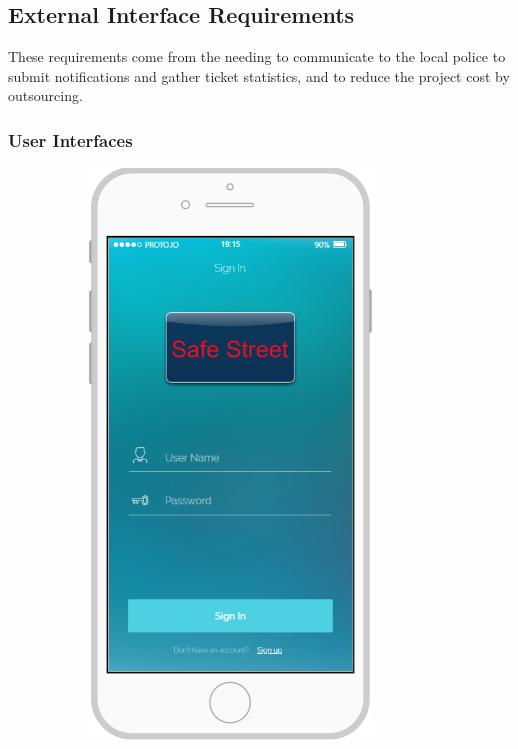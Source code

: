 \documentclass{article}
\begin{document}
\newpage
	\subsection{External Interface Requirements}
		These requirements come from the needing to communicate to the local police to submit notifications and gather ticket statistics, and to reduce the project cost by outsourcing.
		
		\subsubsection{User Interfaces}
		
			\begin{figure}[H]
				\centering
				\begin{subfigure}[H]{0.25\linewidth}
					\includegraphics[width=\linewidth]{Images/Sign_In.png}

\end{subfigure}
\end{figure}
\end{document}
